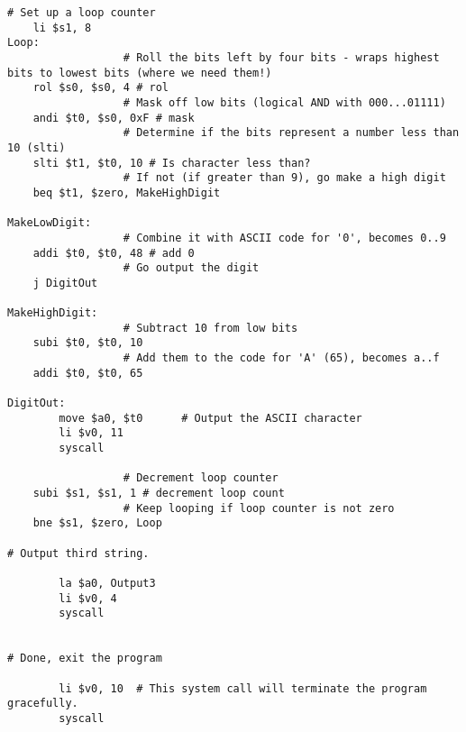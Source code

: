\documentclass[a4paper]{article}
\begin{document}
\begin{Verbatim}[fontsize=\small]
                  # Set up a loop counter
	li $s1, 8
Loop:
                  # Roll the bits left by four bits - wraps highest bits to lowest bits (where we need them!)
	rol $s0, $s0, 4 # rol
                  # Mask off low bits (logical AND with 000...01111)
	andi $t0, $s0, 0xF # mask
                  # Determine if the bits represent a number less than 10 (slti)
	slti $t1, $t0, 10 # Is character less than?
                  # If not (if greater than 9), go make a high digit
	beq $t1, $zero, MakeHighDigit

MakeLowDigit:           
                  # Combine it with ASCII code for '0', becomes 0..9 
	addi $t0, $t0, 48 # add 0
                  # Go output the digit
	j DigitOut

MakeHighDigit:
                  # Subtract 10 from low bits
	subi $t0, $t0, 10
                  # Add them to the code for 'A' (65), becomes a..f
	addi $t0, $t0, 65

DigitOut:
        move $a0, $t0      # Output the ASCII character
        li $v0, 11
        syscall
        
                  # Decrement loop counter
	subi $s1, $s1, 1 # decrement loop count
                  # Keep looping if loop counter is not zero
	bne $s1, $zero, Loop

# Output third string.
        
        la $a0, Output3
        li $v0, 4
        syscall
        
        
# Done, exit the program

        li $v0, 10  # This system call will terminate the program gracefully.
        syscall
\end{Verbatim}
\end{document}

